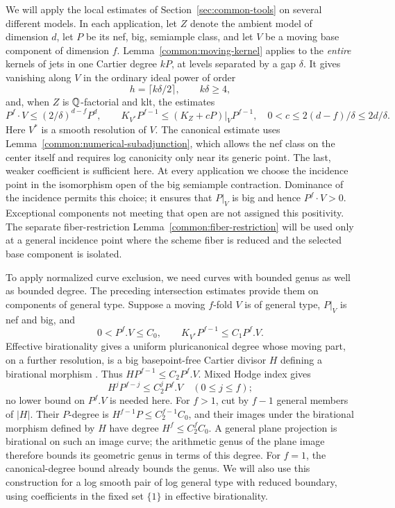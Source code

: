 We will apply the local estimates of Section~\ref{sec:common-tools}
on several different models. In each application, let \(Z\) denote the
ambient model of dimension \(d\), let \(P\) be its nef, big, semiample
class, and let \(V\) be a moving base component of dimension \(f\).
Lemma~\ref{common:moving-kernel} applies to the \emph{entire} kernels
of jets in one Cartier degree \(kP\), at levels separated by a gap
\(\delta\). It gives vanishing along \(V\) in the ordinary ideal power
of order
\[
 h=\lceil k\delta/2\rceil,\qquad k\delta\ge4,
\]
and, when \(Z\) is \(\mathbb{Q}\)-factorial and klt, the estimates
\begin{equation}\label{jet:tracking-estimates}
 P^f\cdot V\le (2/\delta)^{d-f}P^d,
 \qquad K_{V^*}P^{f-1}\le(K_Z+cP)|_V P^{f-1},
 \quad 0<c\le 2(d-f)/\delta\le2d/\delta.
\end{equation}
Here \(V^*\) is a smooth resolution of \(V\). The canonical estimate
uses Lemma~\ref{common:numerical-subadjunction}, which allows the nef
class on the center itself and requires log canonicity only near its
generic point. The last, weaker coefficient is sufficient here. At every
application we choose the incidence point in the isomorphism open of the
big semiample contraction. Dominance of the incidence permits this choice;
it ensures that $P|_V$ is big and hence $P^f\cdot V>0$.
Exceptional components not meeting that open are not assigned this
positivity. The separate fiber-restriction Lemma~\ref{common:fiber-restriction}
will be used only at a general incidence point where the scheme fiber is
reduced and the selected base component is isolated.

To apply normalized curve exclusion, we need curves with bounded
genus as well as bounded degree.  The preceding intersection estimates
provide them on components of general type.  Suppose a moving
\(f\)-fold \(V\) is of general type, \(P|_V\) is nef and big, and
\begin{equation}\label{jet:curve-input}
 0<P^f.V\le C_0,\qquad
 K_{V^*}P^{f-1}\le C_1P^f.V.
\end{equation}
Effective birationality gives a uniform pluricanonical degree whose
moving part, on a further resolution, is a big basepoint-free
Cartier divisor \(H\) defining a birational morphism
\cite[Theorem~4.0.1(3)]{HMX2018}.  Thus
\(HP^{f-1}\le C_2P^f.V\).  Mixed Hodge index gives
\[
 H^jP^{f-j}\le C_2^jP^f.V\quad(0\le j\le f);
\]
no lower bound on \(P^f.V\) is needed here.  For \(f>1\), cut by
\(f-1\) general members of \(|H|\). Their \(P\)-degree is
\(H^{f-1}P\le C_2^{f-1}C_0\), and their images under the birational
morphism defined by \(H\) have degree \(H^f\le C_2^fC_0\).
A general plane projection is birational on such an image curve;
the arithmetic genus of the plane image therefore bounds its geometric
genus in terms of this degree. For \(f=1\), the
canonical-degree bound already bounds the genus.
We will also use this construction for a log smooth pair of log
general type with reduced boundary, using coefficients in the fixed set
\(\{1\}\) in effective birationality.

